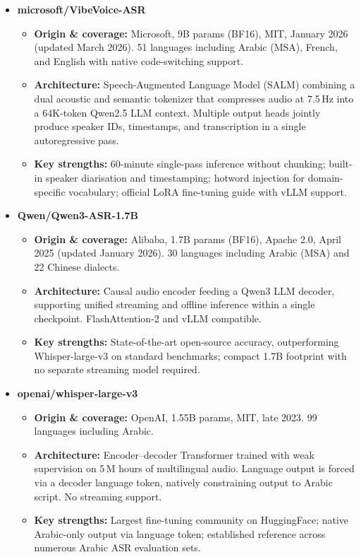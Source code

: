 \documentclass[12pt,a4paper]{report}
\begin{document}
\begin{itemize}
  \item \textbf{microsoft/VibeVoice-ASR}
  \begin{itemize}
    \item \textbf{Origin \& coverage:} Microsoft, 9B params (BF16), MIT, January 2026
    (updated March 2026). 51 languages including Arabic (MSA), French, and English with
    native code-switching support.
    \item \textbf{Architecture:} Speech-Augmented Language Model (SALM) combining a dual
    acoustic and semantic tokenizer that compresses audio at 7.5\,Hz into a 64K-token
    Qwen2.5 LLM context. Multiple output heads jointly produce speaker IDs, timestamps,
    and transcription in a single autoregressive pass.
    \item \textbf{Key strengths:} 60-minute single-pass inference without chunking; built-in
    speaker diarisation and timestamping; hotword injection for domain-specific vocabulary;
    official LoRA fine-tuning guide with vLLM support.
  \end{itemize}

  \item \textbf{Qwen/Qwen3-ASR-1.7B}
  \begin{itemize}
    \item \textbf{Origin \& coverage:} Alibaba, 1.7B params (BF16), Apache 2.0, April 2025
    (updated January 2026). 30 languages including Arabic (MSA) and 22 Chinese dialects.
    \item \textbf{Architecture:} Causal audio encoder feeding a Qwen3 LLM decoder, supporting
    unified streaming and offline inference within a single checkpoint. FlashAttention-2
    and vLLM compatible.
    \item \textbf{Key strengths:} State-of-the-art open-source accuracy, outperforming
    Whisper-large-v3 on standard benchmarks; compact 1.7B footprint with no separate
    streaming model required.
  \end{itemize}

  \item \textbf{openai/whisper-large-v3}
  \begin{itemize}
    \item \textbf{Origin \& coverage:} OpenAI, 1.55B params, MIT, late 2023.
    99 languages including Arabic.
    \item \textbf{Architecture:} Encoder--decoder Transformer trained with weak supervision
    on 5\,M hours of multilingual audio. Language output is forced via a decoder language
    token, natively constraining output to Arabic script. No streaming support.
    \item \textbf{Key strengths:} Largest fine-tuning community on HuggingFace; native
    Arabic-only output via language token; established reference across numerous Arabic
    ASR evaluation sets.
  \end{itemize}


\end{itemize}
\end{document}
